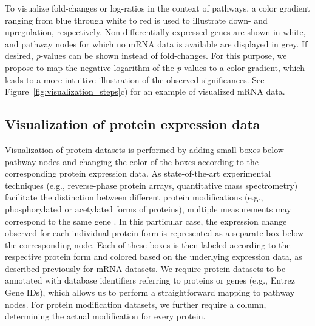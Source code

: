 \documentclass{bioinfo}
\begin{document}
To visualize fold-changes or log-ratios in the context of pathways, a color gradient ranging from
blue through white to red is used to illustrate down- and upregulation,
respectively. Non-differentially expressed genes are shown in white, and pathway nodes for which no
mRNA data is available are displayed in grey. If desired, \emph{p}-values can be shown instead of
fold-changes. For this purpose, we propose to map the negative logarithm of the \emph{p}-values to a
color gradient, which leads to a more intuitive illustration of the observed significances.  See
Figure~\ref{fig:visualization_steps}c) for an example of visualized mRNA data.



\subsection{Visualization of protein expression data}

Visualization of protein datasets is performed by adding small boxes below pathway nodes and
changing the color of the boxes according to the corresponding protein expression data. As state-of-the-art
experimental techniques (e.g., reverse-phase protein arrays, quantitative mass spectrometry)
facilitate the distinction between different protein modifications (e.g., phosphorylated or
acetylated forms of proteins), multiple measurements may correspond to the same gene \citep{Pirnia2009, Yates2009}.
In this particular case, the expression change observed for each individual protein form is represented
as a separate box below the corresponding node. Each of these boxes is then labeled according to the
respective protein form and colored based on the underlying expression data, as described previously
for mRNA datasets. We require protein datasets to be annotated with database identifiers referring
to proteins or genes (e.g., Entrez Gene IDs), which allows us to perform a straightforward mapping to
pathway nodes. For protein modification datasets, we further require a column, determining the
actual modification for every protein.
\end{document}
